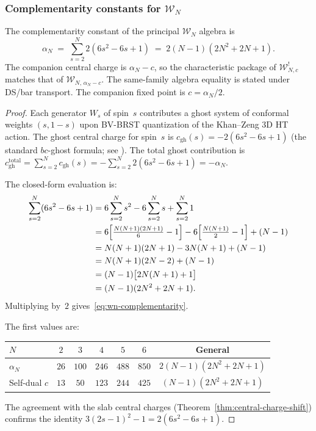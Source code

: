 \subsubsection{Complementarity constants for $\mathcal{W}_N$}
\label{subsubsec:wn-complementarity}

\begin{proposition}
\label{prop:wn-complementarity}
%
%
The complementarity constant of the principal $\mathcal{W}_N$
algebra is
\begin{equation}
\label{eq:wn-complementarity}
\alpha_N
\;=\; \sum_{s=2}^{N} 2(6s^2 - 6s + 1)
\;=\; 2(N-1)(2N^2 + 2N + 1).
\end{equation}
The companion central charge is $\alpha_N-c$, so the characteristic
package of $\mathcal{W}_{N,c}^!$ matches that of
$\mathcal{W}_{N,\,\alpha_N-c}$. The same-family algebra equality is
stated under DS/bar transport. The companion fixed point is
$c=\alpha_N/2$.
\end{proposition}

\begin{proof}
Each generator $W_s$ of spin~$s$ contributes a ghost system of
conformal weights $(s, 1-s)$ upon BV-BRST quantization of the
Khan--Zeng 3D HT action. The ghost central charge for
spin~$s$ is $c_{\mathrm{gh}}(s) = -2(6s^2 - 6s + 1)$
(the standard $bc$-ghost formula; see \cite{FMS86}).
The total ghost contribution is
$c_{\mathrm{gh}}^{\mathrm{total}}
= \sum_{s=2}^N c_{\mathrm{gh}}(s)
= -\sum_{s=2}^N 2(6s^2 - 6s + 1)
= -\alpha_N$.

The closed-form evaluation is:
\begin{align*}
\sum_{s=2}^{N}(6s^2 - 6s + 1)
&= 6\sum_{s=2}^{N} s^2 - 6\sum_{s=2}^{N} s
 + \sum_{s=2}^{N} 1 \\
&= 6\Bigl[\tfrac{N(N+1)(2N+1)}{6} - 1\Bigr]
 - 6\Bigl[\tfrac{N(N+1)}{2} - 1\Bigr]
 + (N-1) \\
&= N(N+1)(2N+1) - 3N(N+1) + (N-1) \\
&= N(N+1)(2N-2) + (N-1) \\
&= (N-1)\bigl[2N(N+1) + 1\bigr] \\
&= (N-1)(2N^2 + 2N + 1).
\end{align*}
Multiplying by~$2$ gives~\eqref{eq:wn-complementarity}.

The first values are:
\begin{center}
\renewcommand{\arraystretch}{1.2}
\begin{tabular}{lcccccc}
\toprule
$N$ & $2$ & $3$ & $4$ & $5$ & $6$ & General \\
\midrule
$\alpha_N$ & $26$ & $100$ & $246$ & $488$ & $850$
 & $2(N-1)(2N^2+2N+1)$ \\
Self-dual $c$ & $13$ & $50$ & $123$ & $244$ & $425$
 & $(N-1)(2N^2+2N+1)$ \\
\bottomrule
\end{tabular}
\end{center}
The agreement with the slab central charges
(Theorem~\ref{thm:central-charge-shift})
confirms the identity $3(2s-1)^2 - 1 = 2(6s^2 - 6s + 1)$.
\end{proof}

